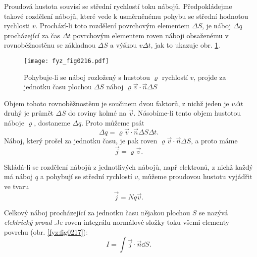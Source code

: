       Proudová hustota souvisí se střední rychlostí toku nábojů. Předpokládejme takové rozdělení 
      nábojů, které vede k usměrněnému pohybu se střední hodnotou rychlosti \(v\). Prochází-li 
      toto rozdělení povrchovým elementem \(\Delta S\), je náboj \(\Delta q\) procházející za čas 
      \(\Delta t\) povrchovým elementem roven náboji obsaženému v rovnoběžnostěnu se základnou 
      \(\Delta S\) a výškou \(v\Delta t\), jak to ukazuje obr. \ref{fyz:fig0216}.
      \begin{figure}[ht!]
        \centering
        \texttt{[image: fyz\_fig0216.pdf]}
        \caption{Pohybuje-li se náboj rozložený s hustotou \(\varrho\) rychlostí \(v\), projde za 
        jednotku času plochou \(\Delta S\) náboj \(\varrho\vec{v}\cdot\vec{n}\Delta S\)}
        \label{fyz:fig0216} 
      \end{figure}
      
      Objem tohoto rovnoběžnostěnu je součinem dvou faktorů, z nichž jeden je \(v\Delta t\) druhý 
      je průmět \(\Delta S\) do roviny kolmé na \(\vec{v}\). Násobíme-li tento objem hustotou 
      náboje \(\varrho\), dostaneme \(\Delta q\). Proto můžeme psát
      \begin{equation}\label{eq_fyz:mag002}
        \Delta q = \varrho\vec{v}\cdot\vec{n}\Delta S\Delta t.
      \end{equation}
      Náboj, který prošel za jednotku času, je pak roven \(\varrho\vec{v}\cdot\vec{n}\Delta S\), a 
      proto máme
      \begin{equation}\label{eq_fyz:mag003}
        \vec{j} = \varrho\vec{v}.
      \end{equation}
      
      Skládá-li se rozdělení nábojů z jednotlivých nábojů, např elektronů, z nichž každý má náboj 
      \(q\) a pohybují se střední rychlostí \(v\), můžeme proudovou hustotu vyjádřit ve tvaru
      \begin{equation}\label{fyz:eq808}
        \vec{j} = Nq\vec{v}.
      \end{equation}
      
      Celkový náboj procházející za jednotku času nějakou plochou \(S\) se nazývá \emph{elektrický 
      proud} .Je roven integrálu normálové složky toku všemi elementy povrchu (obr. 
      \ref{fyz:fig0217}):
      \begin{equation}\label{fyz:eq807}
        I = \int\vec{j}\cdot\vec{n}\dd{S}.
      \end{equation}
    
